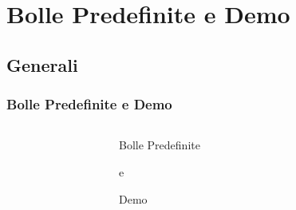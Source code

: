 \section{Bolle Predefinite e Demo}
\subsection{Generali}

\begin{frame}
	\frametitle{Bolle Predefinite e Demo}
	
		
		\begin{columns}
			\begin{column}{0.2\textwidth}
				
			\end{column}
			
			\begin{column}{0.4\textwidth}
				
					 \huge Bolle Predefinite \\
					\begin{center}
					       e \\
					\end{center} 
					\begin{center}
						\huge Demo
					\end{center}
					  
				
				
			\end{column}
			
			\begin{column}{0.2\textwidth}
				
			\end{column}
		\end{columns}
		
		
\end{frame}




